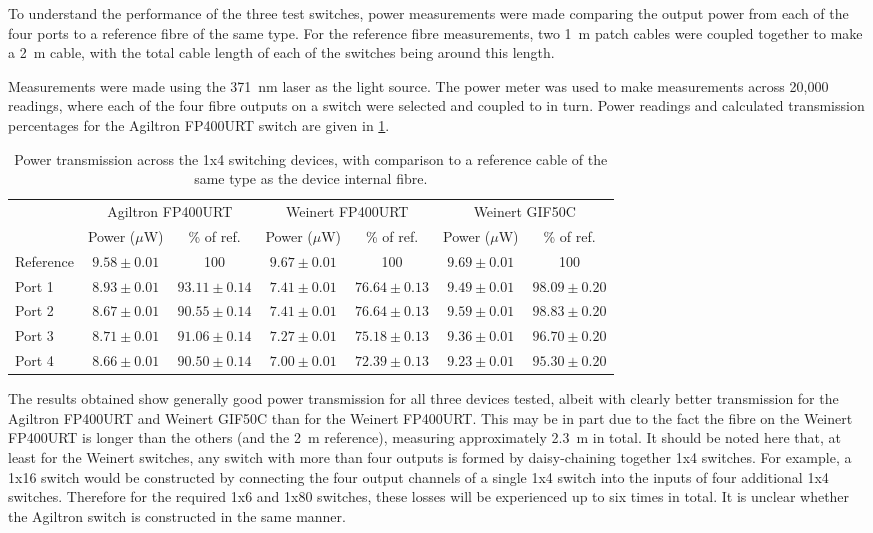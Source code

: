 \documentclass[a4paper,11pt]{article}
\begin{document}
To understand the performance of the three test switches, power measurements were made comparing the output power from each of the four ports to a reference fibre of the same type. For the reference fibre measurements, two 1~m patch cables were coupled together to make a 2~m cable, with the total cable length of each of the switches being around this length.

Measurements were made using the 371~nm laser as the light source. The power meter was used to make measurements across 20,000 readings, where each of the four fibre outputs on a switch were selected and coupled to in turn. Power readings and calculated transmission percentages for the Agiltron FP400URT switch are given in \cref{tab:switchpower}.
\begin{table}[h]
\centering
\begin{tabular}{l|cc|cc|cc}
\toprule
\multirow{2}{*}{} & \multicolumn{2}{c|}{Agiltron FP400URT} & \multicolumn{2}{c|}{Weinert FP400URT} & \multicolumn{2}{c}{Weinert GIF50C} \\
			&	Power ($\mu$W) & \% of ref. & Power ($\mu$W) & \% of ref. & Power ($\mu$W) & \% of ref.\\ \midrule
Reference	& $9.58\pm0.01$	& 100  			 & $9.67\pm0.01$ & 100 			  & $9.69\pm0.01$ & 100 \\
Port 1		& $8.93\pm0.01$	& $93.11\pm0.14$ & $7.41\pm0.01$ & $76.64\pm0.13$ & $9.49\pm0.01$ & $98.09\pm0.20$ \\
Port 2		& $8.67\pm0.01$	& $90.55\pm0.14$ & $7.41\pm0.01$ & $76.64\pm0.13$ & $9.59\pm0.01$ & $98.83\pm0.20$ \\
Port 3		& $8.71\pm0.01$	& $91.06\pm0.14$ & $7.27\pm0.01$ & $75.18\pm0.13$ & $9.36\pm0.01$ & $96.70\pm0.20$ \\
Port 4		& $8.66\pm0.01$	& $90.50\pm0.14$ & $7.00\pm0.01$ & $72.39\pm0.13$ & $9.23\pm0.01$ & $95.30\pm0.20$ \\
\bottomrule
\end{tabular}
\caption{Power transmission across the 1x4 switching devices, with comparison to a reference cable of the same type as the device internal fibre.}\label{tab:switchpower}
\end{table}
The results obtained show generally good power transmission for all three devices tested, albeit with clearly better transmission for the Agiltron FP400URT and Weinert GIF50C than for the Weinert FP400URT. This may be in part due to the fact the fibre on the Weinert FP400URT is longer than the others (and the 2~m reference), measuring approximately 2.3~m in total. It should be noted here that, at least for the Weinert switches, any switch with more than four outputs is formed by daisy-chaining together 1x4 switches. For example, a 1x16 switch would be constructed by connecting the four output channels of a single 1x4 switch into the inputs of four additional 1x4 switches. Therefore for the required 1x6 and 1x80 switches, these losses will be experienced up to six times in total. It is unclear whether the Agiltron switch is constructed in the same manner.
\end{document}
